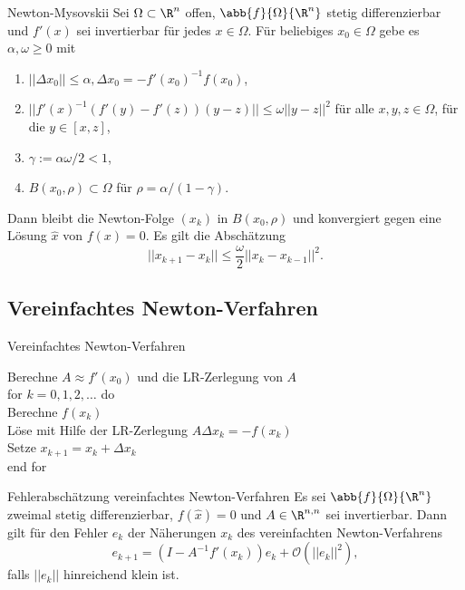 \begin{karte}{Newton-Mysovskii}
    Sei \( \Omega \subset \R^n \) offen, \( \abb{f}{\Omega}{\R^n} \) stetig 
    differenzierbar und \(f'(x)\) sei invertierbar für jedes \(x\in \Omega\).
    Für beliebiges \(x_0 \in \Omega\) gebe es \( \alpha, \omega \geq 0 \) mit 
    \begin{enumerate}
        \item \( ||\Delta x_0 ||\leq \alpha, \Delta x_0 = - f'(x_0)^{-1} f(x_0) \),
        \item \( ||f'(x)^{-1}(f'(y) - f'(z))(y-z)||\leq \omega ||y-z||^2 \) 
        für alle \(x,y,z\in\Omega\), für die \(y\in [x,z]\),
        \item \( \gamma := \alpha \omega/2 < 1 \),
        \item \( B(x_0, \rho) \subset \Omega \) für \( \rho = \alpha/(1-\gamma) \).
    \end{enumerate}
    Dann bleibt die Newton-Folge \( (x_k) \) in \(B(x_0, \rho)\) und konvergiert gegen eine Lösung 
    \( \widehat{x} \) von \( f(x) = 0 \). Es gilt die Abschätzung 
    \[ ||x_{k+1} - x_k||\leq \frac{\omega}{2} ||x_k - x_{k-1}||^2. \]
\end{karte}

\subsection{Vereinfachtes Newton-Verfahren}

\begin{karte}{Vereinfachtes Newton-Verfahren}
    \begin{tabbing}
        Berechne \( A \approx f'(x_0) \) und die LR-Zerlegung von \(A\) \\
        for \= \(k = 0,1,2,\ldots\) do \\
        \> Berechne \( f(x_k) \) \\
        \> Löse mit Hilfe der LR-Zerlegung \( A\Delta x_k = - f(x_k) \) \\
        \> Setze \( x_{k+1} = x_k + \Delta x_k \) \\
        end for
    \end{tabbing}
\end{karte}

\begin{karte}{Fehlerabschätzung vereinfachtes Newton-Verfahren}
    Es sei \( \abb{f}{\Omega}{\R^n} \) zweimal stetig differenzierbar, 
    \( f(\widehat{x}) = 0 \) und \(A\in \R^{n,n}\) sei invertierbar. 
    Dann gilt für den Fehler \(e_k\) der Näherungen \(x_k\) des vereinfachten 
    Newton-Verfahrens 
    \[ e_{k+1} = (I - A^{-1}f'(x_k)) e_k + \mathcal{O}(||e_k||^2), \]
    falls \(||e_k||\) hinreichend klein ist.
\end{karte}

